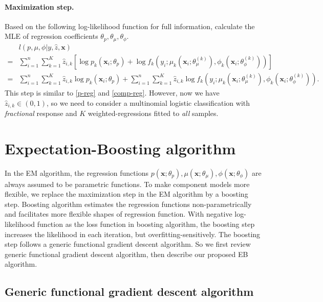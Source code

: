 \documentclass[11pt]{article}
\numberwithin{equation}{section}
\def\bx{\boldsymbol{x}}
\begin{document}
\paragraph{Maximization step.}
	Based on the following log-likelihood function for full information, calculate the MLE of regression coefficients  $\theta_p, \theta_\mu, \theta_\phi$.
	\begin{equation}
		\begin{aligned}
			&l(p,\mu,\phi|y,\hat{z},\bx)\\
			=&\sum_{i=1}^n\sum_{k=1}^K \hat{z}_{i,k}\left[\log p_k(\bx_i;\theta_p) + \log f_k\left(y_i;\mu_k\left(\bx_i;\theta_\mu^{(k)}\right),\phi_k\left(\bx_i;\theta_\phi^{(k)}\right)\right)\right]\\
			=&\sum_{i=1}^n\sum_{k=1}^K \hat{z}_{i,k}\log p_k(\bx_i;\theta_p) + \sum_{i=1}^n\sum_{k=1}^K \hat{z}_{i,k}\log f_k\left(y_i;\mu_k\left(\bx_i;\theta_\mu^{(k)}\right),\phi_k\left(\bx_i;\theta_\phi^{(k)}\right)\right).
		\end{aligned}
	\end{equation}
	This step is similar to \eqref{p-reg} and \eqref{comp-reg}. However, now we have $\hat{z}_{i,k}\in(0,1)$, 
	so we need to consider a multinomial logistic classification with {\it fractional} response and $K$ {weighted}-regressions fitted to {\it all} samples.

\section{Expectation-Boosting algorithm}\label{sec:EB}
In the EM algorithm, the regression functions $p(\bx;\theta_p), \mu(\bx;\theta_\mu), \phi(\bx;\theta_\phi)$ are always assumed to be parametric functions.
To make component models more flexible, we replace the maximization step in the EM algorithm by a boosting step.
Boosting algorithm estimates the regression functions non-parametrically and facilitates more flexible shapes of regression function.
With negative log-likelihood function as the loss function in boosting algorithm, the boosting step increases the likelihood in each iteration, but overfitting-sensitively.
The boosting step follows a generic functional gradient descent algorithm.
So we first review generic functional gradient descent algorithm, then describe our proposed EB algorithm.

\subsection{Generic functional gradient descent algorithm}
\end{document}
